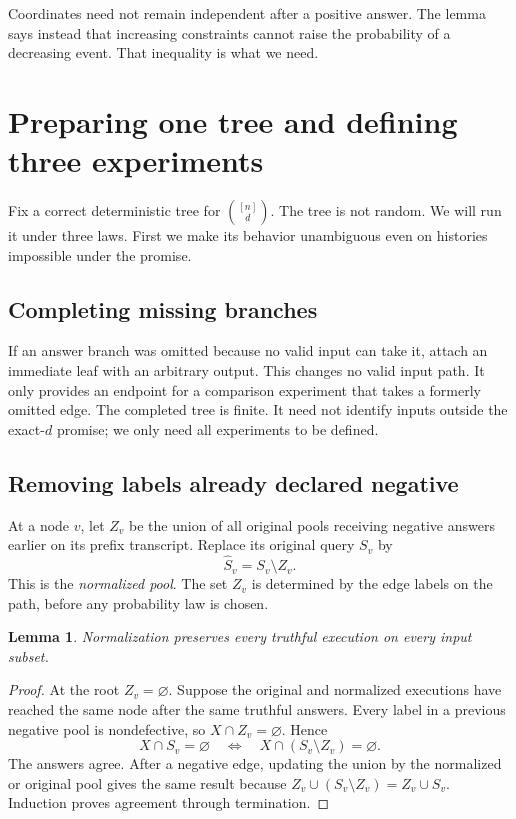 \documentclass[11pt]{article}
\newtheorem{lemma}[theorem]{Lemma}
\theoremstyle{definition}
\theoremstyle{remark}
\numberwithin{equation}{section}
\begin{document}
Coordinates need not remain independent after a positive answer.
The lemma says instead that increasing constraints cannot raise the
probability of a decreasing event. That inequality is what we need.

\section{Preparing one tree and defining three experiments}\label{sec:experiments}

Fix a correct deterministic tree for \(\binom{[n]}d\). The tree is
not random. We will run it under three laws. First we make its
behavior unambiguous even on histories impossible under the promise.

\subsection{Completing missing branches}

If an answer branch was omitted because no valid input can take it,
attach an immediate leaf with an arbitrary output. This changes no
valid input path. It only provides an endpoint for a comparison
experiment that takes a formerly omitted edge.
The completed tree is finite. It need not identify inputs outside
the exact-\(d\) promise; we only need all experiments to be defined.

\subsection{Removing labels already declared negative}

At a node \(v\), let \(Z_v\) be the union of all original pools
receiving negative answers earlier on its prefix transcript.
Replace its original query \(S_v\) by
\begin{equation}\label{eq:normalization}
 \widehat S_v=S_v\setminus Z_v.
\end{equation}
This is the \emph{normalized pool}. The set \(Z_v\) is determined by
the edge labels on the path, before any probability law is chosen.

\begin{lemma}\label{lem:normalization}
Normalization preserves every truthful execution on every input subset.
\end{lemma}
\begin{proof}
At the root \(Z_v=\varnothing\). Suppose the original and normalized
executions have reached the same node after the same truthful answers.
Every label in a previous negative pool is nondefective, so
\(X\cap Z_v=\varnothing\). Hence
\[
 X\cap S_v=\varnothing
 \quad\Longleftrightarrow\quad X\cap(S_v\setminus Z_v)=\varnothing.
\]
The answers agree. After a negative edge, updating the union by the
normalized or original pool gives the same result because
\(Z_v\cup(S_v\setminus Z_v)=Z_v\cup S_v\).
Induction proves agreement through termination.
\end{proof}
\end{document}
